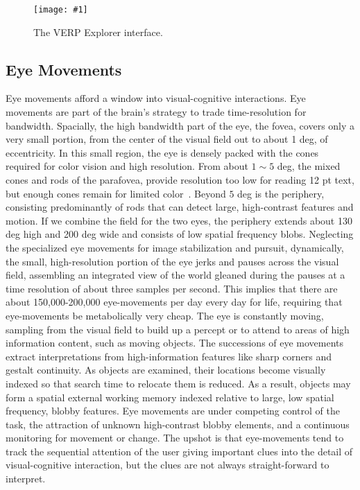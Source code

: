 \documentclass{sigchi}
\newcommand{\insertpicture}[2]{\begin{center}\texttt{[image: \#1]}\end{center}}
\begin{document}
\begin{figure*}
	\insertpicture{figures/interface.pdf}{0.85}
	\caption{The VERP Explorer interface.\label{fig:interface}}
\end{figure*}

\subsection{Eye Movements} Eye movements afford a window into
visual-cognitive interactions. Eye movements are part of the brain's strategy to trade time-resolution for bandwidth. Spacially, the high bandwidth part of the eye, the fovea, covers only a very small portion, from the center of the visual field out to about 1 deg, of eccentricity.
 In this small region, the eye is densely packed with the cones required for
color vision and high resolution. From about $1\sim 5$ deg, the mixed cones and rods
of the parafovea, provide resolution too low for reading 12 pt text, but enough cones remain for limited color~\cite{Kieras_2014}.  Beyond $ 5$ deg is
the periphery, consisting predominantly of rods that can detect large, high-contrast
features and motion. If we combine the field for the two eyes, the
periphery extends about 130 deg high and 200 deg wide and consists of low spatial
frequency blobs. Neglecting the specialized eye movements for image stabilization and pursuit, dynamically, the small, high-resolution portion of the eye jerks and pauses across  the visual field, assembling an integrated view of the world gleaned during the pauses at a time resolution of about three
samples per second. This implies that there are about 150,000-200,000
eye-movements per day every day for life, requiring that eye-movements be
metabolically very cheap.  The eye is constantly moving, sampling from the
visual field to build up a percept or to attend to areas of high
information content, such as moving objects. The successions of eye
movements extract interpretations from high-information features like sharp
corners and gestalt continuity. As objects are examined, their locations
become visually indexed so that search time to relocate them is reduced. As
a result, objects may form a spatial external working memory indexed
relative to large, low spatial frequency, blobby features. Eye movements
are under competing control of the task, the attraction of unknown
high-contrast blobby elements, and a continuous monitoring for movement or
change. The upshot is that eye-movements tend to track the sequential
attention of the user giving important clues into the detail of
visual-cognitive interaction, but the clues are not always straight-forward
to interpret. 
\end{document}
